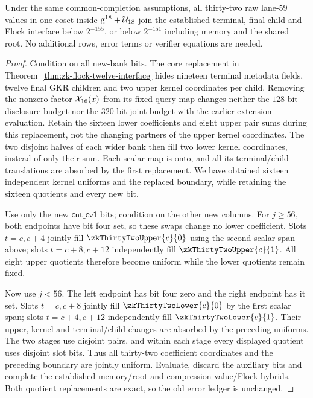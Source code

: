 \begin{theorem}\label{thm:zk-highbank-interface}
Under the same common-completion assumptions, all thirty-two raw lane-$59$ values in one coset inside $\mathsf{g}^{18}+\mathcal{U}_{18}$ join the established terminal, final-child and Flock interface below $2^{-155}$, or below $2^{-151}$ including memory and the shared root. No additional rows, error terms or verifier equations are needed.
\end{theorem}
\begin{proof}
Condition on all new-bank bits. The core replacement in Theorem~\ref{thm:zk-flock-twelve-interface} hides nineteen terminal metadata fields, twelve final GKR children and two upper kernel coordinates per child. Removing the nonzero factor $\mathcal{X}_{16}(x)$ from its fixed query map changes neither the $128$-bit disclosure budget nor the $320$-bit joint budget with the earlier extension evaluation. Retain the sixteen lower coefficients and eight upper pair sums during this replacement, not the changing partners of the upper kernel coordinates. The two disjoint halves of each wider bank then fill two lower kernel coordinates, instead of only their sum. Each scalar map is onto, and all its terminal/child translations are absorbed by the first replacement. We have obtained sixteen independent kernel uniforms and the replaced boundary, while retaining the sixteen quotients and every new bit.

Use only the new $\mathsf{cnt\_cv1}$ bits; condition on the other new columns. For $j\ge56$, both endpoints have bit four set, so these swaps change no lower coefficient. Slots $t=c,c+4$ jointly fill $\zkThirtyTwoUpper{c}{0}$ using the second scalar span above; slots $t=c+8,c+12$ independently fill $\zkThirtyTwoUpper{c}{1}$. All eight upper quotients therefore become uniform while the lower quotients remain fixed.

Now use $j<56$. The left endpoint has bit four zero and the right endpoint has it set. Slots $t=c,c+8$ jointly fill $\zkThirtyTwoLower{c}{0}$ by the first scalar span; slots $t=c+4,c+12$ independently fill $\zkThirtyTwoLower{c}{1}$. Their upper, kernel and terminal/child changes are absorbed by the preceding uniforms. The two stages use disjoint pairs, and within each stage every displayed quotient uses disjoint slot bits. Thus all thirty-two coefficient coordinates and the preceding boundary are jointly uniform. Evaluate, discard the auxiliary bits and complete the established memory/root and compression-value/Flock hybrids. Both quotient replacements are exact, so the old error ledger is unchanged.
\end{proof}

